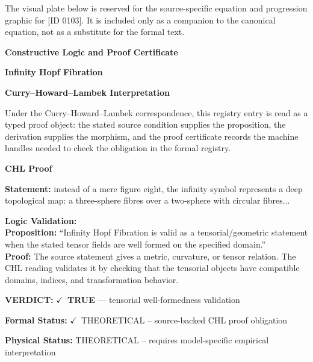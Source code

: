 \begingroup\footnotesize\sloppy
The visual plate below is reserved for the source-specific equation and progression graphic for [ID 0103]. It is included only as a companion to the canonical equation, not as a substitute for the formal text.
\par\endgroup
\ifTZPDarkEdition
{}
\fi

\clearpage
\begingroup\tzpsupportsetup
\noindent\textbf{\fontsize{10.8pt}{12.8pt}\selectfont [ID 0103] Constructive Logic and Proof Certificate}\par
\noindent\textbf{\fontsize{10pt}{12pt}\selectfont Infinity Hopf Fibration}\par
\vspace{0.45em}
\begingroup
\footnotesize
\setlength{\parskip}{0.22em}
\setlength{\parindent}{0pt}
\noindent\textbf{Curry--Howard--Lambek Interpretation}\par
Under the Curry--Howard--Lambek correspondence, this registry entry is read as a typed proof
object: the stated source condition supplies the proposition, the derivation supplies the
morphism, and the proof certificate records the machine handles needed to check the obligation
in the formal registry.

\vspace{0.45em}
\noindent\textbf{CHL Proof}\par
\textbf{Statement:} instead of a mere figure eight, the infinity symbol represents a deep topological map: a
three-sphere fibres over a two-sphere with circular fibres...

\textbf{Logic Validation:}\\
\textbf{Proposition:} ``Infinity Hopf Fibration is valid as a tensorial/geometric statement when the stated
tensor fields are well formed on the specified domain.''\\
\textbf{Proof:} The source statement gives a metric, curvature, or tensor relation. The CHL reading
validates it by checking that the tensorial objects have compatible domains, indices,
and transformation behavior.

\textbf{VERDICT:} \ensuremath{\checkmark}\ \textbf{TRUE} --- tensorial well-formedness validation

\textbf{Formal Status:} \ensuremath{\checkmark}\ THEORETICAL -- source-backed CHL proof obligation

\textbf{Physical Status:} THEORETICAL -- requires model-specific empirical interpretation
\par\vspace{0.45em}
\par
\ifTZPDarkEdition
{}
\fi
\endgroup
\endgroup
